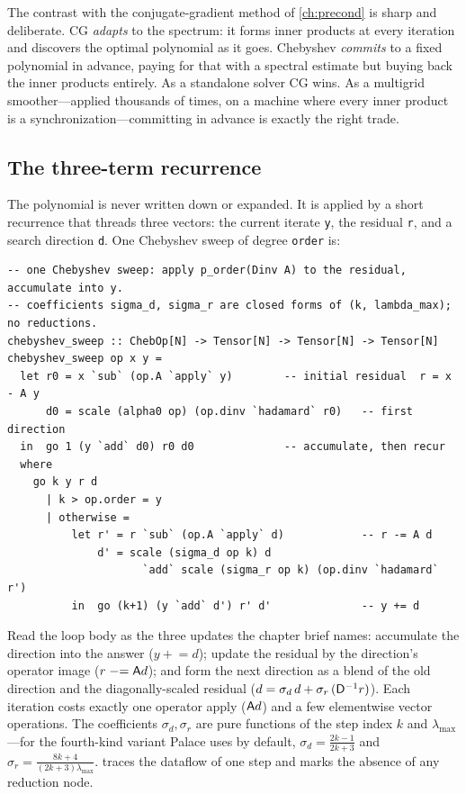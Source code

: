 \begin{physicsbox}
The contrast with the conjugate-gradient method of \cref{ch:precond} is sharp and
deliberate. CG \emph{adapts} to the spectrum: it forms inner products at every
iteration and discovers the optimal polynomial as it goes. Chebyshev \emph{commits}
to a fixed polynomial in advance, paying for that with a spectral estimate but
buying back the inner products entirely. As a standalone solver CG wins. As a
multigrid smoother---applied thousands of times, on a machine where every inner
product is a synchronization---committing in advance is exactly the right trade.
\end{physicsbox}

\subsection{The three-term recurrence}

The polynomial is never written down or expanded. It is applied by a short
recurrence that threads three vectors: the current iterate \lstinline[style=l4style]|y|,
the residual \lstinline[style=l4style]|r|, and a search direction
\lstinline[style=l4style]|d|. One Chebyshev sweep of degree
\lstinline[style=l4style]|order| is:

\begin{lstlisting}[style=l4style]
-- one Chebyshev sweep: apply p_order(Dinv A) to the residual, accumulate into y.
-- coefficients sigma_d, sigma_r are closed forms of (k, lambda_max); no reductions.
chebyshev_sweep :: ChebOp[N] -> Tensor[N] -> Tensor[N] -> Tensor[N]
chebyshev_sweep op x y =
  let r0 = x `sub` (op.A `apply` y)        -- initial residual  r = x - A y
      d0 = scale (alpha0 op) (op.dinv `hadamard` r0)   -- first direction
  in  go 1 (y `add` d0) r0 d0              -- accumulate, then recur
  where
    go k y r d
      | k > op.order = y
      | otherwise =
          let r' = r `sub` (op.A `apply` d)            -- r -= A d
              d' = scale (sigma_d op k) d
                     `add` scale (sigma_r op k) (op.dinv `hadamard` r')
          in  go (k+1) (y `add` d') r' d'              -- y += d
\end{lstlisting}

Read the loop body as the three updates the chapter brief names: accumulate the
direction into the answer ($y \mathrel{+}= d$); update the residual by the
direction's operator image ($r \mathrel{-}= \mathsf{A}d$); and form the next direction
as a blend of the old direction and the diagonally-scaled residual
($d = \sigma_d\,d + \sigma_r\,(\mathsf{D}^{-1}r)$). Each iteration costs exactly one
operator apply ($\mathsf{A}d$) and a few elementwise vector operations. The
coefficients $\sigma_d, \sigma_r$ are pure functions of the step index $k$ and
$\lambda_{\max}$---for the fourth-kind variant Palace uses by default,
$\sigma_d = \tfrac{2k-1}{2k+3}$ and $\sigma_r = \tfrac{8k+4}{(2k+3)\lambda_{\max}}$.
 traces the dataflow of one step and marks the absence
of any reduction node.

